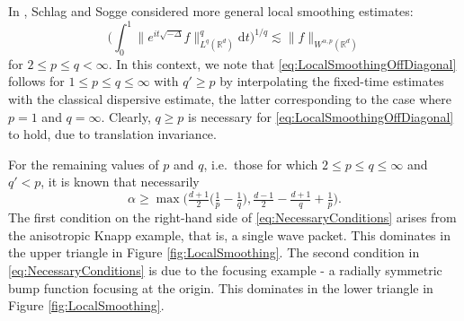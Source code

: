 \documentclass{amsart}
\numberwithin{equation}{section}
\theoremstyle{definition}
\newcommand{\R}{\mathbb{R}}
\newcommand {\ud}{\mathrm{d}}
\begin{document}
In \cite{SchlagSogge1997}, Schlag and Sogge considered more general local smoothing estimates:
\begin{equation}
\label{eq:LocalSmoothingOffDiagonal}
\Big(\int_{0}^{1}\|e^{it \sqrt{-\Delta}} f\|_{L^{q}(\R^d)}^{q}\ud t\Big)^{1/q}\lesssim \| f \|_{W^{\alpha,p}(\R^d)}
\end{equation}
for $2\leq p\leq q<\infty$. In this context, 
we note that \eqref{eq:LocalSmoothingOffDiagonal} follows for $1\leq p\leq q\leq \infty$ with $q'\geq p$ by interpolating the fixed-time estimates with the classical dispersive estimate, the latter corresponding to the case where $p=1$ and $q=\infty$. 
Clearly, $q\geq p$ is necessary for \eqref{eq:LocalSmoothingOffDiagonal} to hold, due to translation invariance. 

For the remaining values of $p$ and $q$, i.e.~those for which $2\leq p\leq q\leq \infty$ and $q'<p$, it is known that necessarily
\begin{equation}
\label{eq:NecessaryConditions}
\alpha \geq \max\big(\tfrac{d+1}{2} \big( \tfrac{1}{p} - \tfrac{1}{q} \big), \tfrac{d-1}{2} - \tfrac{d+1}{q} + \tfrac{1}{p}\big).
\end{equation}
The first condition on the right-hand side of \eqref{eq:NecessaryConditions} arises from the anisotropic Knapp example, that is, a single wave packet. This dominates in the upper triangle in Figure \ref{fig:LocalSmoothing}. The second condition in \eqref{eq:NecessaryConditions} is due to the focusing example - a radially symmetric bump function focusing at the origin. This dominates in the lower triangle in Figure \ref{fig:LocalSmoothing}. 
\end{document}
